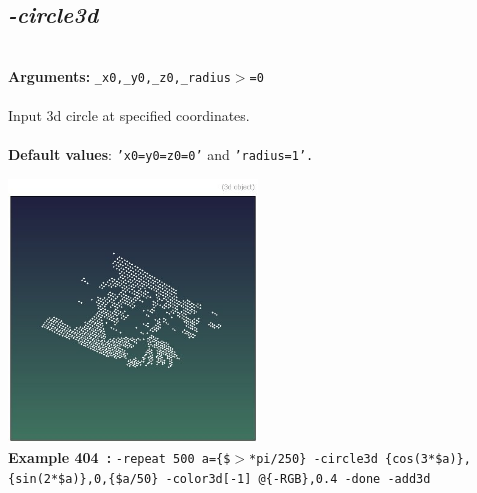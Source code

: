 \documentclass[a4paper,11pt,twoside]{book}
\begin{document}
\subsection{\emph{-circle3d} }\vspace*{-0.5em}
~\\\textbf{Arguments: } 
{\small \texttt{\_x0,\_y0,\_z0,\_radius$>$=0}}\\~\\
Input 3d circle at specified coordinates.
~\\~\\\textbf{Default values}: {\small \texttt{'x0=y0=z0=0'} and \texttt{'radius=1'.}}
\begin{center}\includegraphics[keepaspectratio=true,height=7cm,width=\textwidth]{img/gmic_def404.jpg}\\
{\footnotesize \textbf{Example 404~:} \texttt{-repeat 500 a=\{\$$>$*pi/250\} -circle3d \{cos(3*\$a)\},\{sin(2*\$a)\},0,\{\$a/50\} -color3d[-1] @\{-RGB\},0.4 -done -add3d}}
\end{center}
\end{document}
